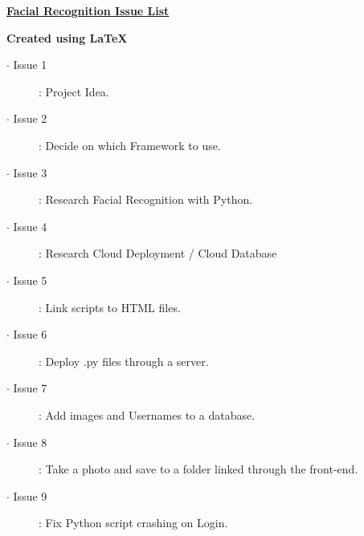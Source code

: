 \documentclass{article}
\begin{document}
\textbf{\underline{Facial Recognition Issue List}}

\textbf{Created using LaTeX}

\begin{description}
\item[$\cdot$ Issue 1]: Project Idea.
\item[$\cdot$ Issue 2]: Decide on which Framework to use.
\item[$\cdot$ Issue 3]: Research Facial Recognition with Python.
\item[$\cdot$ Issue 4]: Research Cloud Deployment / Cloud Database
\item[$\cdot$ Issue 5]: Link scripts to HTML files.
\item[$\cdot$ Issue 6]: Deploy .py files through a server.
\item[$\cdot$ Issue 7]: Add images and Usernames to a database.
\item[$\cdot$ Issue 8]: Take a photo and save to a folder linked through the front-end.
\item[$\cdot$ Issue 9]: Fix Python script crashing on Login.
\end{description}
\end{document}
